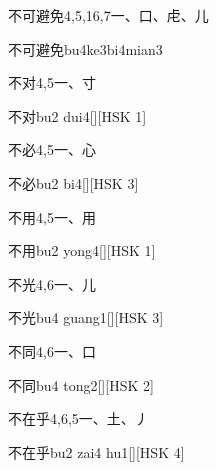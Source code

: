 \begin{entry}{不可避免}{4,5,16,7}{⼀、⼝、⾌、⼉}
  \begin{phonetics}{不可避免}{bu4ke3bi4mian3}
  \end{phonetics}
\end{entry}

\begin{entry}{不对}{4,5}{⼀、⼨}
  \begin{phonetics}{不对}{bu2 dui4}[][HSK 1]
  \end{phonetics}
\end{entry}

\begin{entry}{不必}{4,5}{⼀、⼼}
  \begin{phonetics}{不必}{bu2 bi4}[][HSK 3]
  \end{phonetics}
\end{entry}

\begin{entry}{不用}{4,5}{⼀、⽤}
  \begin{phonetics}{不用}{bu2 yong4}[][HSK 1]
  \end{phonetics}
\end{entry}

\begin{entry}{不光}{4,6}{⼀、⼉}
  \begin{phonetics}{不光}{bu4 guang1}[][HSK 3]
  \end{phonetics}
\end{entry}

\begin{entry}{不同}{4,6}{⼀、⼝}
  \begin{phonetics}{不同}{bu4 tong2}[][HSK 2]
  \end{phonetics}
\end{entry}

\begin{entry}{不在乎}{4,6,5}{⼀、⼟、⼃}
  \begin{phonetics}{不在乎}{bu2 zai4 hu1}[][HSK 4]
  \end{phonetics}
\end{entry}

